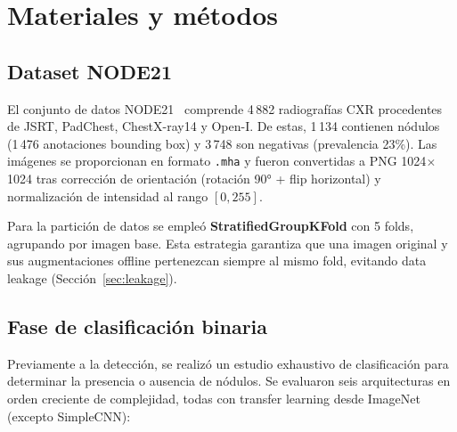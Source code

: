 \documentclass[conference]{IEEEtran}
\begin{document}
\section{Materiales y métodos}

\subsection{Dataset NODE21}

El conjunto de datos NODE21~\cite{node21} comprende 4\,882 radiografías CXR procedentes de JSRT, PadChest, ChestX-ray14 y Open-I. De estas, 1\,134 contienen nódulos (1\,476 anotaciones bounding box) y 3\,748 son negativas (prevalencia 23\%). Las imágenes se proporcionan en formato \texttt{.mha} y fueron convertidas a PNG 1024$\times$1024 tras corrección de orientación (rotación 90° + flip horizontal) y normalización de intensidad al rango $[0,255]$.

Para la partición de datos se empleó \textbf{StratifiedGroupKFold} con 5 folds, agrupando por imagen base. Esta estrategia garantiza que una imagen original y sus augmentaciones offline pertenezcan siempre al mismo fold, evitando data leakage (Sección~\ref{sec:leakage}).

\subsection{Fase de clasificación binaria}
\label{sec:clasificacion}

Previamente a la detección, se realizó un estudio exhaustivo de clasificación para determinar la presencia o ausencia de nódulos. Se evaluaron seis arquitecturas en orden creciente de complejidad, todas con transfer learning desde ImageNet (excepto SimpleCNN):
\end{document}
